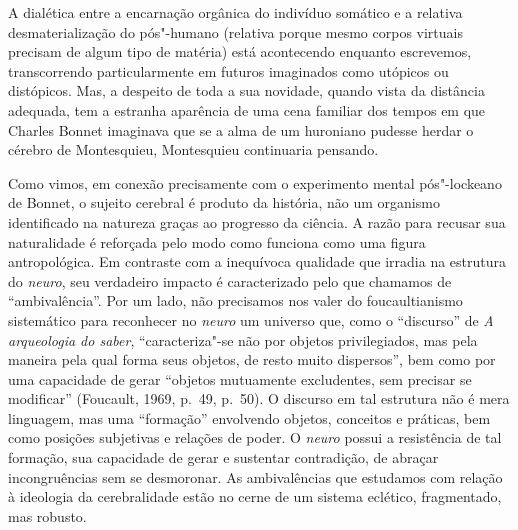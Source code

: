 A dialética entre a encarnação orgânica do indivíduo somático e a
relativa desmaterialização do pós"-humano (relativa porque mesmo corpos
virtuais precisam de algum tipo de matéria) está acontecendo enquanto
escrevemos, transcorrendo particularmente em futuros imaginados como
utópicos ou distópicos. Mas, a despeito de toda a sua novidade, quando
vista da distância adequada, tem a estranha aparência de uma cena
familiar dos tempos em que Charles Bonnet imaginava que se a alma de um
huroniano pudesse herdar o cérebro de Montesquieu, Montesquieu
continuaria pensando.

Como vimos, em conexão precisamente com o experimento mental
pós"-lockeano de Bonnet, o sujeito cerebral é produto da história, não um
organismo identificado na natureza graças ao progresso da ciência. A
razão para recusar sua naturalidade é reforçada pelo modo como funciona
como uma figura antropológica. Em contraste com a inequívoca qualidade
que irradia na estrutura do \emph{neuro}, seu verdadeiro impacto é
caracterizado pelo que chamamos de ``ambivalência''. Por um lado, não
precisamos nos valer do foucaultianismo sistemático para reconhecer no
\emph{neuro} um universo que, como o ``discurso'' de \emph{A arqueologia
do saber}, ``caracteriza"-se não por objetos privilegiados, mas pela
maneira pela qual forma seus objetos, de resto muito dispersos'', bem
como por uma capacidade de gerar ``objetos mutuamente excludentes, sem
precisar se modificar'' (Foucault, 1969, p.~49, p.~50). O discurso em tal
estrutura não é mera linguagem, mas uma ``formação'' envolvendo objetos,
conceitos e práticas, bem como posições subjetivas e relações de poder.
O \emph{neuro} possui a resistência de tal formação, sua capacidade de
gerar e sustentar contradição, de abraçar incongruências sem se
desmoronar. As ambivalências que estudamos com relação à ideologia da
cerebralidade estão no cerne de um sistema eclético, fragmentado, mas
robusto.

